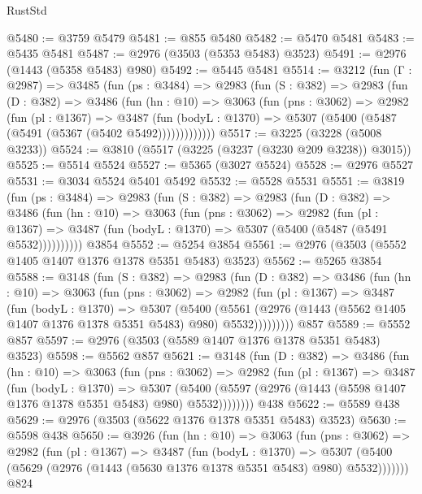 \begin{lexlean}{RustStd}
\begin{coremodule}
@5480 := @3759 @5479
@5481 := @855 @5480
@5482 := @5470 @5481
@5483 := @5435 @5481
@5487 := @2976 (@3503 (@5353 @5483) @3523)
@5491 := @2976 (@1443 (@5358 @5483) @980)
@5492 := @5445 @5481
@5514 := @3212
    (fun (Γ : @2987) =>
    @3485
      (fun (ps : @3484) =>
      @2983
        (fun (S : @382) =>
        @2983
          (fun (D : @382) =>
          @3486
            (fun (hn : @10) =>
            @3063
              (fun (pns : @3062) =>
              @2982
                (fun (pl : @1367) =>
                @3487
                  (fun (bodyL : @1370) =>
                  @5307 (@5400 (@5487 (@5491 (@5367 (@5402 @5492)))))))))))))
@5517 := @3225 (@3228 (@5008 @3233))
@5524 := @3810 (@5517 (@3225 (@3237 (@3230 @209 @3238)) @3015))
@5525 := @5514 @5524
@5527 := @5365 (@3027 @5524)
@5528 := @2976 @5527
@5531 := @3034 @5524 @5401 @5492
@5532 := @5528 @5531
@5551 := @3819
    (fun (ps : @3484) =>
    @2983
      (fun (S : @382) =>
      @2983
        (fun (D : @382) =>
        @3486
          (fun (hn : @10) =>
          @3063
            (fun (pns : @3062) =>
            @2982
              (fun (pl : @1367) =>
              @3487 (fun (bodyL : @1370) => @5307 (@5400 (@5487 (@5491 @5532))))))))))
    @3854
@5552 := @5254 @3854
@5561 := @2976 (@3503 (@5552 @1405 @1407 @1376 @1378 @5351 @5483) @3523)
@5562 := @5265 @3854
@5588 := @3148
    (fun (S : @382) =>
    @2983
      (fun (D : @382) =>
      @3486
        (fun (hn : @10) =>
        @3063
          (fun (pns : @3062) =>
          @2982
            (fun (pl : @1367) =>
            @3487
              (fun (bodyL : @1370) =>
              @5307
                (@5400
                  (@5561
                    (@2976 (@1443 (@5562 @1405 @1407 @1376 @1378 @5351 @5483) @980) @5532)))))))))
    @857
@5589 := @5552 @857
@5597 := @2976 (@3503 (@5589 @1407 @1376 @1378 @5351 @5483) @3523)
@5598 := @5562 @857
@5621 := @3148
    (fun (D : @382) =>
    @3486
      (fun (hn : @10) =>
      @3063
        (fun (pns : @3062) =>
        @2982
          (fun (pl : @1367) =>
          @3487
            (fun (bodyL : @1370) =>
            @5307
              (@5400 (@5597 (@2976 (@1443 (@5598 @1407 @1376 @1378 @5351 @5483) @980) @5532))))))))
    @438
@5622 := @5589 @438
@5629 := @2976 (@3503 (@5622 @1376 @1378 @5351 @5483) @3523)
@5630 := @5598 @438
@5650 := @3926
    (fun (hn : @10) =>
    @3063
      (fun (pns : @3062) =>
      @2982
        (fun (pl : @1367) =>
        @3487
          (fun (bodyL : @1370) =>
          @5307 (@5400 (@5629 (@2976 (@1443 (@5630 @1376 @1378 @5351 @5483) @980) @5532)))))))
    @824

\end{coremodule}
\end{lexlean}
